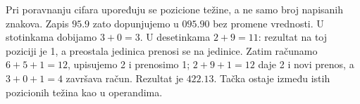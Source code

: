 Pri poravnanju cifara upoređuju se pozicione težine, a ne samo broj napisanih znakova. Zapis $95.9$ zato dopunjujemo u $095.90$ bez promene vrednosti. U stotinkama dobijamo $3+0=3$. U desetinkama $2+9=11$: rezultat na toj poziciji je 1, a preostala jedinica prenosi se na jedinice. Zatim računamo $6+5+1=12$, upisujemo 2 i prenosimo 1; $2+9+1=12$ daje 2 i novi prenos, a $3+0+1=4$ završava račun. Rezultat je $422.13$. Tačka ostaje između istih pozicionih težina kao u operandima.

